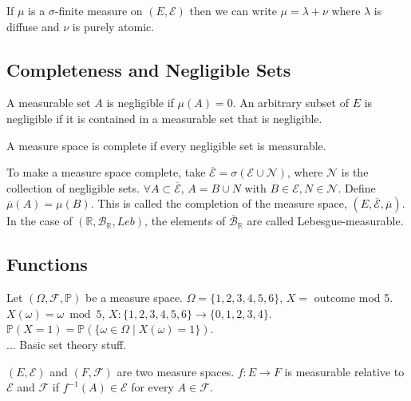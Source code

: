 \documentclass[english, course]{Notes}
\begin{document}
\begin{lemma}
	If $\mu$ is a $\sigma$-finite measure on $(E, \mathcal{E})$ then we can write $\mu = \lambda + \nu$ where $\lambda$ is diffuse and $\nu$ is purely atomic.
\end{lemma}

\subsection{Completeness and Negligible Sets}

\begin{definition}
	A measurable set $A$ is negligible if $\mu(A) = 0$. An arbitrary subset of $E$ is negligible if it is contained in a measurable set that is negligible.
\end{definition}

\begin{definition}
	A measure space is complete if every negligible set is measurable.
\end{definition}

\begin{lemma}
	To make a measure space complete, take $\overline{\mathcal{E}} = \sigma(\mathcal{E} \cup \mathcal{N})$, where $\mathcal{N}$ is the collection of negligible sets. $\forall A \subset \overline{\mathcal{E}}$, $A = B \cup N$ with $B \in \mathcal{E}, N \in \mathcal{N}$. Define $\overline{\mu}(A) = \mu(B)$. This is called the completion of the measure space, $(E, \overline{\mathcal{E}}, \overline{\mu})$. In the case of $(\mathbb{R}, \mathcal{B}_{\mathbb{R}}, Leb)$, the elements of $\overline{\mathcal{B}}_\mathbb{R}$ are called Lebesgue-measurable.\\
\end{lemma}


\subsection{Functions}

Let $(\Omega, \mathcal{F}, \mathbb{P})$ be a measure space. $\Omega = \{1, 2, 3, 4, 5, 6\}$, $X =$ outcome mod 5. $X(\omega) = \omega \bmod 5$, $X: \{1, 2, 3, 4, 5, 6\} \to \{0, 1, 2, 3, 4\}$. $\mathbb{P}(X = 1) = \mathbb{P}(\{\omega \in \Omega \mid X(\omega) = 1\})$.\\

... Basic set theory stuff.\\

\begin{definition}
	$(E, \mathcal{E})$ and $(F, \mathcal{F})$ are two measure spaces. $f: E \to F$ is measurable relative to $\mathcal{E}$ and $\mathcal{F}$ if $f^{-1}(A) \in \mathcal{E}$ for every $A \in \mathcal{F}$.
\end{definition}
\end{document}
